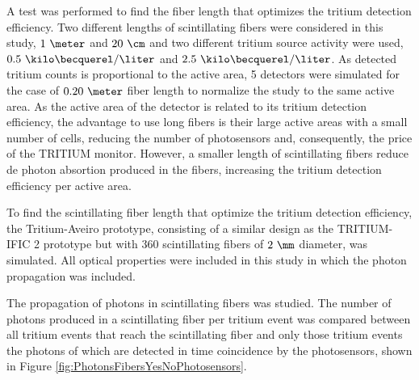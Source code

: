 A test was performed to find the fiber length that optimizes the tritium detection efficiency. Two different lengths of scintillating fibers were considered in this study, $1~\meter$ and $20~\cm$ and two different tritium source activity were used, $0.5~\kilo\becquerel/\liter$ and $2.5~\kilo\becquerel/\liter$. As detected tritium counts is proportional to the active area, 5 detectors were simulated for the case of $0.20~\meter$ fiber length to normalize the study to the same active area. As the active area of the detector is related to its tritium detection efficiency, the advantage to use long fibers is their large active areas with a small number of cells, reducing the number of photosensors and, consequently, the price of the TRITIUM monitor. However, a smaller length of scintillating fibers reduce de photon absortion produced in the fibers, increasing the tritium detection efficiency per active area.

To find the scintillating fiber length that optimize the tritium detection efficiency, the Tritium-Aveiro prototype, consisting of a similar design as the TRITIUM-IFIC 2 prototype but with $360$ scintillating fibers of $2~\mm$ diameter, was simulated. All optical properties were included in this study in which the photon propagation was included.

The propagation of photons in scintillating fibers was studied. The number of photons produced in a scintillating fiber per tritium event was compared between all tritium events that reach the scintillating fiber and only those  tritium events the photons of which are detected in time coincidence by the photosensors, shown in Figure \ref{fig:PhotonsFibersYesNoPhotosensors}.

